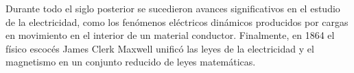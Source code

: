 Durante todo el siglo posterior se sucedieron avances significativos en el estudio de la electricidad, como los fenómenos eléctricos dinámicos producidos por cargas en movimiento en el interior de un material conductor. Finalmente, en 1864 el físico escocés James Clerk Maxwell unificó las leyes de la electricidad y el magnetismo en un conjunto reducido de leyes matemáticas.
